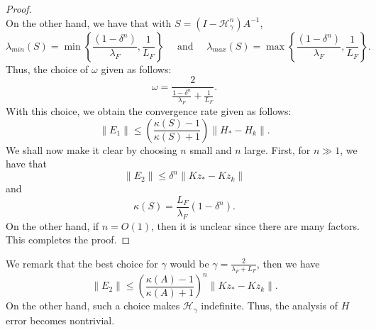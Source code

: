 \begin{itemize}
\begin{proof}
\begin{equation}
\end{equation}
On the other hand, we have that with $S = (I - \mathcal{H}_\gamma^n)A^{-1}$, 
\begin{equation*} 
\lambda_{min}(S) = \min \left \{ \frac{(1 - \delta^n)}{\lambda_F}, \frac{1}{L_F}    \right \} \quad \mbox{ and } \quad \lambda_{max}(S) = \max \left \{ \frac{(1 - \delta^n)}{\lambda_F}, \frac{1}{L_F}    \right \}.  
\end{equation*} 
Thus, the choice of $\omega$ given as follows:  
\begin{equation}
\omega = \frac{2}{\frac{1 - \delta^n}{\lambda_F} + \frac{1}{L_F}}. 
\end{equation} 
With this choice, we obtain the convergence rate given as follows: 
\begin{equation}
\|E_1\| \leq \left ( \frac{\kappa(S) - 1}{\kappa(S) + 1} \right ) \|H_* - H_k\|. 
\end{equation} 
We shall now make it clear by choosing $n$ small and $n$ large. First, for $n \gg 1$, we have that
\begin{equation}
\|E_2\| \leq \delta^n \|Kz_* - Kz_k\| 
\end{equation}
and 
\begin{equation}
\kappa(S) = \frac{L_F}{\lambda_F} (1 - \delta^n).  
\end{equation} 
On the other hand, if $n = O(1)$, then it is unclear since there are many factors. This completes the proof. 
\end{proof} 
\begin{remark}
We remark that the best choice for $\gamma$ would be $\gamma = \frac{2}{\lambda_F + L_F}$, then we have 
\begin{equation}
\|E_2\| \leq \left ( \frac{\kappa(A) - 1}{\kappa(A) + 1} \right )^n \|Kz_* - Kz_k\|.
\end{equation}
On the other hand, such a choice makes $\mathcal{H}_\gamma$ indefinite. Thus, the analysis of $H$ error becomes nontrivial. 
\end{remark} 


\end{itemize}
